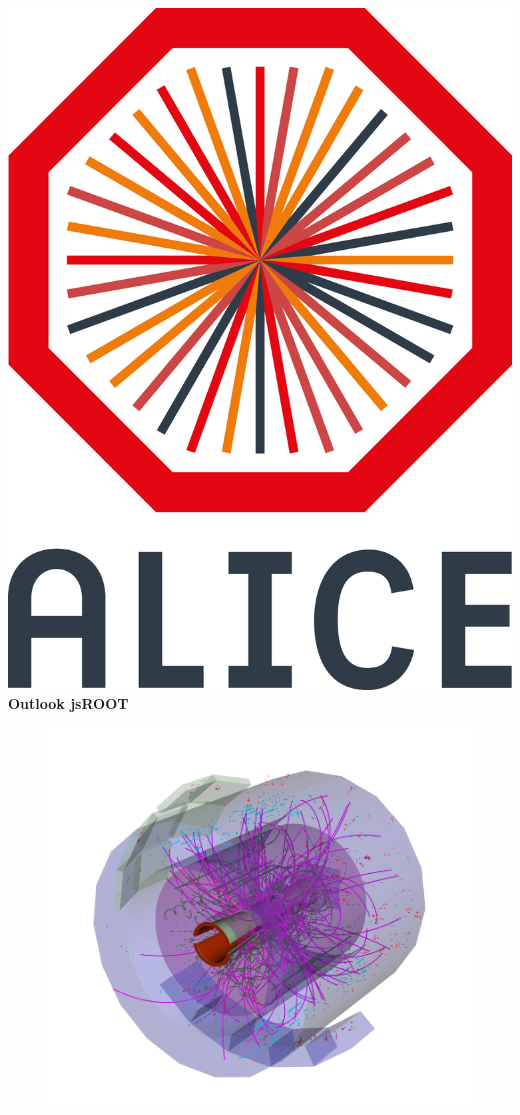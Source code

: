 \documentclass[aspectratio=169,14pt,dvipsnames]{beamer}
\begin{document}
\begin{frame}{\includegraphics[height=0.07\textheight]{2012-Jul-04-4_Color_Logo_CB.png} \hspace{0.2cm}\textbf{Outlook jsROOT}}
  \begin{figure}
    \centering
    \includegraphics[height=0.8\textheight]{jsROOTDisplay.png}\hspace{0cm}
  \end{figure}
\end{frame}
\end{document}

